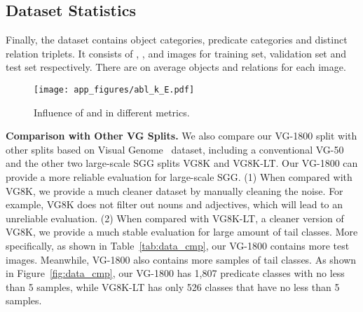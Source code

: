 \documentclass[runningheads]{llncs}
\begin{document}
\subsection{Dataset Statistics}
Finally, the dataset contains  object categories,  predicate categories and  distinct relation triplets.
It consists of , , and  images for training set, validation set and test set respectively.
There are on average  objects and  relations for each image.


\begin{figure*}
    \centering
    \texttt{[image: app\_figures/abl\_k\_E.pdf]}
    \caption{Influence of  and  in different metrics.}
    \label{fig:abl_kIE}
\end{figure*}




\smallskip
\noindent
\textbf{Comparison with Other VG Splits.}
We also compare our VG-1800 split with other splits based on Visual Genome~\cite{krishna2017visual} dataset, including a conventional VG-50 and the other two large-scale SGG splits VG8K and VG8K-LT.
Our VG-1800 can provide a more reliable evaluation for large-scale SGG.
(1) When compared with VG8K, we provide a much cleaner dataset by manually cleaning the noise.
For example, VG8K does not filter out nouns and adjectives, which will lead to an unreliable evaluation.
(2) When compared with VG8K-LT, a cleaner version of VG8K, we provide a much stable evaluation for large amount of tail classes.
More specifically, as shown in Table~\ref{tab:data_cmp}, our VG-1800 contains more test images.
Meanwhile, VG-1800 also contains more samples of tail classes.
As shown in Figure~\ref{fig:data_cmp}, our VG-1800 has 1,807 predicate classes with no less than 5 samples, while VG8K-LT has only 526 classes that have no less than 5 samples.


\begin{table}[]
    \setlength{\tabcolsep}{15pt}
    \centering
    \caption{Comparison between different datasets' predicate filtration and split ratio. Filtration denotes the method to remove noisy predicates. The Train, Val, and Test denote number of images in training set, validation set and test set.}
    \label{tab:data_cmp}


\end{table}
\end{document}
